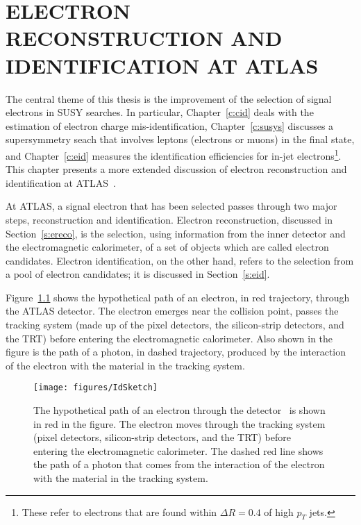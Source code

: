 
\chapter{ELECTRON RECONSTRUCTION AND IDENTIFICATION AT ATLAS}\label{c:ereid}

The central theme of this thesis is the improvement of the selection of signal
electrons in SUSY searches. In particular, Chapter~\ref{c:cid} deals with the
estimation of electron charge mis-identification, Chapter~\ref{c:susys}
discusses a supersymmetry seach that involves leptons (electrons or muons) in
the final state, and Chapter~\ref{c:eid} measures the identification
efficiencies for in-jet electrons\footnote{These refer to electrons that are
	found within $\Delta R = 0.4$ of high $p_T$ jets.}. This chapter presents a
more extended discussion of electron reconstruction and identification at
ATLAS~\cite{atlaselcid}.

At ATLAS, a signal electron that has been selected passes through two major
steps, reconstruction and identification. Electron reconstruction, discussed in
Section~\ref{s:ereco}, is the selection, using information from the inner
detector and the electromagnetic calorimeter, of a set of objects which are
called electron candidates. Electron identification, on the other hand, refers
to the selection from a pool of electron candidates; it is discussed in
Section~\ref{s:eid}.

Figure~\ref{f:elcid}\cite{atlaselcid} shows the hypothetical path of an
electron, in red trajectory, through the ATLAS detector. The electron emerges
near the collision point, passes the tracking system (made up of the pixel
detectors, the silicon-strip detectors, and the TRT) before entering the
electromagnetic calorimeter. Also shown in the figure is the path of a photon,
in dashed trajectory, produced by the interaction of the electron with the
material in the tracking system.

\begin{figure}[h]
	\texttt{[image: figures/IdSketch]}
	\centering

	\caption{The hypothetical path of an electron through the
		detector~\cite{atlaselcid} is shown in red in the figure. The electron moves
		through the tracking system (pixel detectors, silicon-strip detectors, and the
		TRT) before entering the electromagnetic calorimeter. The dashed red line shows
		the path of a photon that comes from the interaction of the electron with the
		material in the tracking system.}

	\label{f:elcid}

\end{figure}


